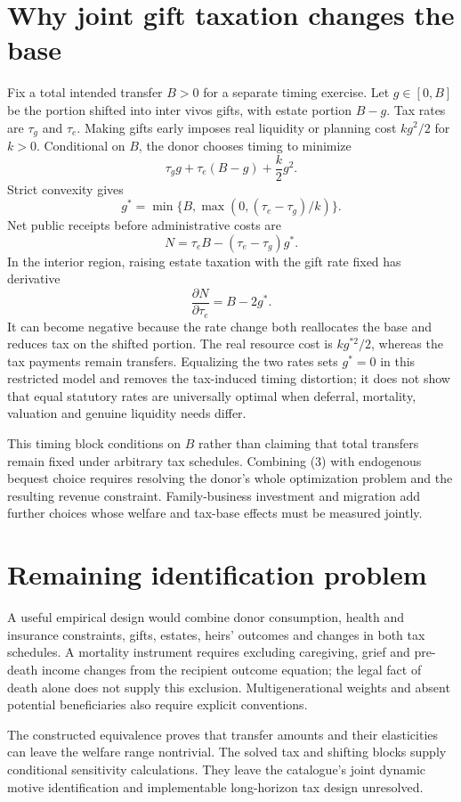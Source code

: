 \documentclass[11pt]{article}
\begin{document}
\section*{Why joint gift taxation changes the base}
Fix a total intended transfer $B>0$ for a separate timing exercise. Let $g\in[0,B]$ be the portion shifted into inter vivos gifts, with estate portion $B-g$. Tax rates are $\tau_g$ and $\tau_e$. Making gifts early imposes real liquidity or planning cost $kg^2/2$ for $k>0$. Conditional on $B$, the donor chooses timing to minimize
\[
 \tau_g g+\tau_e(B-g)+\frac k2g^2.
\]
Strict convexity gives
\[
 g^*=\min\{B,\max(0,(\tau_e-\tau_g)/k)\}.            \tag{3}
\]
Net public receipts before administrative costs are
\[
 N=\tau_eB-(\tau_e-\tau_g)g^*.
\]
In the interior region, raising estate taxation with the gift rate fixed has derivative
\[
 \frac{\partial N}{\partial\tau_e}=B-2g^*.
\]
It can become negative because the rate change both reallocates the base and reduces tax on the shifted portion. The real resource cost is $kg^{*2}/2$, whereas the tax payments remain transfers. Equalizing the two rates sets $g^*=0$ in this restricted model and removes the tax-induced timing distortion; it does not show that equal statutory rates are universally optimal when deferral, mortality, valuation and genuine liquidity needs differ.

This timing block conditions on $B$ rather than claiming that total transfers remain fixed under arbitrary tax schedules. Combining (3) with endogenous bequest choice requires resolving the donor's whole optimization problem and the resulting revenue constraint. Family-business investment and migration add further choices whose welfare and tax-base effects must be measured jointly.

\section*{Remaining identification problem}
A useful empirical design would combine donor consumption, health and insurance constraints, gifts, estates, heirs' outcomes and changes in both tax schedules. A mortality instrument requires excluding caregiving, grief and pre-death income changes from the recipient outcome equation; the legal fact of death alone does not supply this exclusion. Multigenerational weights and absent potential beneficiaries also require explicit conventions.

The constructed equivalence proves that transfer amounts and their elasticities can leave the welfare range nontrivial. The solved tax and shifting blocks supply conditional sensitivity calculations. They leave the catalogue's joint dynamic motive identification and implementable long-horizon tax design unresolved.
\end{document}
